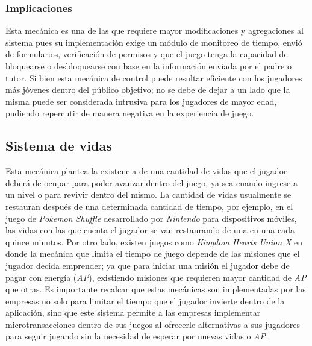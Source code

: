 \subsubsection{Implicaciones}
Esta mecánica es una de las que requiere mayor modificaciones y agregaciones al 
sistema pues su implementación exige un módulo de monitoreo de tiempo, envió de 
formularios, verificación de permisos y que el juego tenga la capacidad de 
bloquearse o desbloquearse con base en la información enviada por el padre o 
tutor. Si bien esta mecánica de control puede resultar eficiente con los 
jugadores más jóvenes dentro del público objetivo; no se debe de dejar a un lado 
que la misma puede ser considerada intrusiva para los jugadores de mayor edad, 
pudiendo repercutir de manera negativa en la experiencia de juego. 

\subsection{Sistema de vidas}
Esta mecánica plantea la existencia de una cantidad de vidas que el jugador 
deberá de ocupar para poder avanzar dentro del juego, ya sea cuando ingrese a un 
nivel o para revivir dentro del mismo. La cantidad de vidas usualmente se 
restauran después de una determinada cantidad de tiempo, por ejemplo, en el 
juego de \textit{Pokemon Shuffle} desarrollado por \textit{Nintendo} para 
dispositivos móviles, las vidas con las que cuenta el jugador se van restaurando 
de una en una cada quince minutos.  Por otro lado, existen juegos como\textit{ 
Kingdom Hearts Union X} en donde la mecánica que limita el tiempo de juego 
depende de las misiones que el jugador decida emprender; ya que para iniciar una 
misión el jugador debe de pagar con energía (\textit{AP}), existiendo misiones 
que requieren mayor cantidad de \textit{AP} que otras. Es importante recalcar 
que estas mecánicas son implementadas por las empresas no solo para limitar el 
tiempo que el jugador invierte dentro de la aplicación, sino que este sistema 
permite a las empresas implementar microtransacciones dentro de sus juegos al 
ofrecerle alternativas a sus jugadores para seguir jugando sin la necesidad de 
esperar por nuevas vidas o \textit{AP.}  
